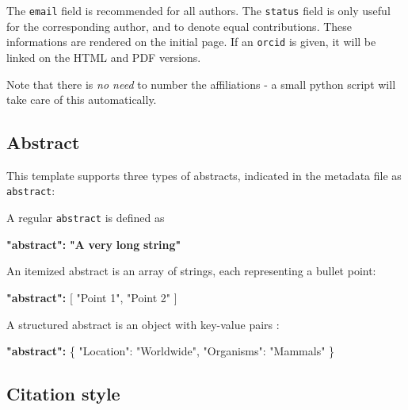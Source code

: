 \documentclass[10pt,oneside]{article}
\newenvironment{Shaded}{\begin{snugshade}}{\end{snugshade}}
\newcommand{\DataTypeTok}[1]{\textcolor[rgb]{0.13,0.29,0.53}{#1}}
\newcommand{\StringTok}[1]{\textcolor[rgb]{0.31,0.60,0.02}{#1}}
\newcommand{\OtherTok}[1]{\textcolor[rgb]{0.56,0.35,0.01}{#1}}
\newcommand{\FunctionTok}[1]{\textcolor[rgb]{0.00,0.00,0.00}{#1}}
\newcommand{\ErrorTok}[1]{\textcolor[rgb]{0.64,0.00,0.00}{\textbf{#1}}}
\begin{document}
The \texttt{email} field is recommended for all authors. The
\texttt{status} field is only useful for the corresponding author, and
to denote equal contributions. These informations are rendered on the
initial page. If an \texttt{orcid} is given, it will be linked on the
HTML and PDF versions.

Note that there is \emph{no need} to number the affiliations - a small
python script will take care of this automatically.

\hypertarget{abstract}{%
\subsection{Abstract}\label{abstract}}

This template supports three types of abstracts, indicated in the
metadata file as \texttt{abstract}:

A regular \texttt{abstract} is defined as

\begin{Shaded}
\begin{Highlighting}[]
\ErrorTok{"abstract":} \ErrorTok{"A} \ErrorTok{very} \ErrorTok{long} \ErrorTok{string"}
\end{Highlighting}
\end{Shaded}

An itemized abstract is an array of strings, each representing a bullet
point:

\begin{Shaded}
\begin{Highlighting}[]
\ErrorTok{"abstract":} \OtherTok{[}
    \StringTok{"Point 1"}\OtherTok{,}
    \StringTok{"Point 2"}
\OtherTok{]}
\end{Highlighting}
\end{Shaded}

A structured abstract is an object with key-value pairs :

\begin{Shaded}
\begin{Highlighting}[]
\ErrorTok{"abstract":} \FunctionTok{\{}
    \DataTypeTok{"Location"}\FunctionTok{:} \StringTok{"Worldwide"}\FunctionTok{,}
    \DataTypeTok{"Organisms"}\FunctionTok{:} \StringTok{"Mammals"}
\FunctionTok{\}}
\end{Highlighting}
\end{Shaded}

\hypertarget{citation-style}{%
\subsection{Citation style}\label{citation-style}}
\end{document}
